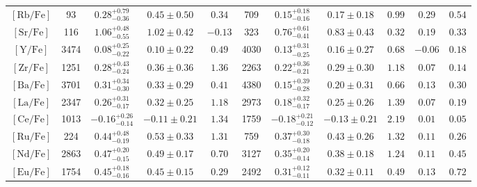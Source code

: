 \begin{table*}
\begin{tabular}{c|cccc|cccc|cc}
\hline
$\mathrm{[Rb/Fe]}$ & 93 & $0.28_{-0.36}^{+0.79}$ & $0.45 \pm 0.50$ & $0.34$ & 709 & $0.15_{-0.16}^{+0.18}$ & $0.17 \pm 0.18$ & $0.99$ & $0.29$ & $0.54$  \\
$\mathrm{[Sr/Fe]}$ & 116 & $1.06_{-0.55}^{+0.48}$ & $1.02 \pm 0.42$ & $-0.13$ & 323 & $0.76_{-0.41}^{+0.61}$ & $0.83 \pm 0.43$ & $0.32$ & $0.19$ & $0.33$  \\
$\mathrm{[Y/Fe]}$ & 3474 & $0.08_{-0.22}^{+0.25}$ & $0.10 \pm 0.22$ & $0.49$ & 4030 & $0.13_{-0.25}^{+0.31}$ & $0.16 \pm 0.27$ & $0.68$ & $-0.06$ & $0.18$  \\
$\mathrm{[Zr/Fe]}$ & 1251 & $0.28_{-0.24}^{+0.43}$ & $0.36 \pm 0.36$ & $1.36$ & 2263 & $0.22_{-0.21}^{+0.36}$ & $0.29 \pm 0.30$ & $1.18$ & $0.07$ & $0.14$  \\
$\mathrm{[Ba/Fe]}$ & 3701 & $0.31_{-0.30}^{+0.34}$ & $0.33 \pm 0.29$ & $0.41$ & 4380 & $0.15_{-0.28}^{+0.39}$ & $0.20 \pm 0.31$ & $0.66$ & $0.13$ & $0.30$  \\
$\mathrm{[La/Fe]}$ & 2347 & $0.26_{-0.17}^{+0.31}$ & $0.32 \pm 0.25$ & $1.18$ & 2973 & $0.18_{-0.17}^{+0.32}$ & $0.25 \pm 0.26$ & $1.39$ & $0.07$ & $0.19$  \\
$\mathrm{[Ce/Fe]}$ & 1013 & $-0.16_{-0.14}^{+0.26}$ & $-0.11 \pm 0.21$ & $1.34$ & 1759 & $-0.18_{-0.12}^{+0.21}$ & $-0.13 \pm 0.21$ & $2.19$ & $0.01$ & $0.05$  \\
\hline
$\mathrm{[Ru/Fe]}$ & 224 & $0.44_{-0.19}^{+0.48}$ & $0.53 \pm 0.33$ & $1.31$ & 759 & $0.37_{-0.18}^{+0.30}$ & $0.43 \pm 0.26$ & $1.32$ & $0.11$ & $0.26$  \\
$\mathrm{[Nd/Fe]}$ & 2863 & $0.47_{-0.15}^{+0.20}$ & $0.49 \pm 0.17$ & $0.70$ & 3127 & $0.35_{-0.14}^{+0.20}$ & $0.38 \pm 0.18$ & $1.24$ & $0.11$ & $0.45$  \\
$\mathrm{[Eu/Fe]}$ & 1754 & $0.45_{-0.16}^{+0.18}$ & $0.45 \pm 0.15$ & $0.29$ & 2492 & $0.31_{-0.11}^{+0.12}$ & $0.32 \pm 0.11$ & $0.49$ & $0.13$ & $0.72$  \\
\hline
\end{tabular}
\end{table*}
\endgroup
